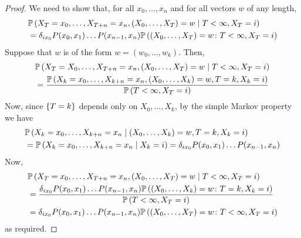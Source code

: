 \begin{proof}
	We need to show that, for all \( x_0, \dots, x_n \) and for all vectors \( w \) of any length,
	\begin{align*}
		 & \mathbb{P}\left({X_T = x_0, \dots, X_{T+n} = x_n, (X_0, \dots, X_T) = w \mid T < \infty, X_T = i}\right)                    \\
		 & = \delta_{i x_0} P(x_0,x_1) \dots P(x_{n-1}, x_n) \mathbb{P}\left({(X_0, \dots, X_T) = w \colon T < \infty, X_T = i}\right)
	\end{align*}
	Suppose that \( w \) is of the form \( w = (w_0, \dots, w_k) \).
	Then,
	\begin{align*}
		 & \mathbb{P}\left({X_T = X_0, \dots, X_{T+n} = x_n, (X_0, \dots, X_T) = w \mid T < \infty, X_T = i}\right)                      \\
		 & = \frac{\mathbb{P}\left({X_k = x_0, \dots, X_{k+n} = x_n, (X_0, \dots, X_k)=w, T=k,X_k=i}\right)}{\mathbb{P}\left({T < \infty, X_T = i}\right)}
	\end{align*}
	Now, since \( \qty{T=k} \) depends only on \( X_0, \dots, X_k \), by the simple Markov property we have
	\begin{align*}
		 & \mathbb{P}\left({X_k = x_0, \dots, X_{k+n} = x_n \mid (X_0, \dots, X_k) = w, T = k, X_k = i}\right)                        \\
		 & = \mathbb{P}\left({X_k = x_0, \dots, X_{k+n} = x_n \mid X_k = i}\right) = \delta_{i x_0} P(x_0, x_1) \dots P(x_{n-1}, x_n)
	\end{align*}
	Now,
	\begin{align*}
		 & \mathbb{P}\left({X_T = x_0, \dots, X_{T+n} = x_n, (X_0, \dots, X_T) = w \mid T < \infty, X_T = i}\right)                                                  \\
		 & = \frac{\delta_{i x_0} P(x_0,x_1) \dots P(x_{n-1}, x_n) \mathbb{P}\left({(X_0, \dots, X_k) = w \colon T = k, X_k = i}\right)}{\mathbb{P}\left({T < \infty, X_T = i}\right)} \\
		 & = \delta_{i x_0} P(x_0,x_1) \dots P(x_{n-1}, x_n) \mathbb{P}\left({(X_0, \dots, X_T) = w \colon T < \infty, X_T = i}\right)
	\end{align*}
	as required.
\end{proof}
